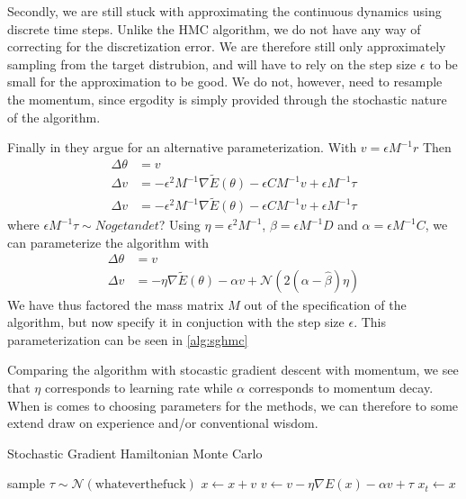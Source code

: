 Secondly, we are still stuck with approximating the continuous dynamics using discrete time steps. Unlike the HMC algorithm, we do not have any way of correcting for the discretization error. 
We are therefore still only approximately sampling from the target distrubion, and will have to rely on the step size $\epsilon$ to be small for the approximation to be good. We do not, however, need to resample the momentum, since ergodity is simply provided through the stochastic nature of the algorithm.

Finally in \cite{chen_stochastic_2014} they argue for an alternative parameterization. With $v = \epsilon M^{-1} r$ Then
\begin{align}
    \Delta \theta &=  v \\
    \Delta v &=  -\epsilon^2 M^{-1} \nabla\tilde{E}(\theta) - \epsilon CM^{-1}v  + \epsilon M^{-1}\tau \\
    \Delta v &=  -\epsilon^2 M^{-1} \nabla\tilde{E}(\theta) - \epsilon CM^{-1}v  + \epsilon M^{-1}\tau
\end{align}
where $\epsilon M^{-1}\tau\sim Noget andet$? Using $\eta = \epsilon^2M^{-1}$, $\beta = \epsilon M^{-1} D$ and $\alpha = \epsilon M^{-1}C$, we can parameterize the algorithm with
\begin{align}
    \Delta \theta &=  v \\
    \Delta v &=  -\eta \nabla\tilde{E}(\theta) - \alpha v  + \mathcal{N}(2(\alpha-\hat{\beta})\eta)
\end{align}
We have thus factored the mass matrix $M$ out of the specification of the algorithm, but now specify it in conjuction with the step size $\epsilon$. 
This parameterization can be seen in \cref{alg:sghmc}

Comparing the algorithm with stocastic gradient descent with momentum, we see that  $\eta$ corresponds to learning rate while $\alpha$ corresponds to momentum decay. 
When is comes to choosing parameters for the methods, we can therefore to some extend draw on experience and/or conventional wisdom.

\begin{algorithm}[H]
    \caption{Stochastic Gradient Hamiltonian Monte Carlo} \label{alg:sghmc}
    \begin{algorithmic}
            \State sample $\tau \sim \mathcal{N}(\text{whateverthefuck})$
            \State $x\gets x + v $ 
            \State $v\gets v - \eta \nabla E(x) - \alpha v + \tau$
        \EndFor
        \State $x_{t} \gets x$
        \EndFor
        \end{algorithmic}
    \end{algorithm}

